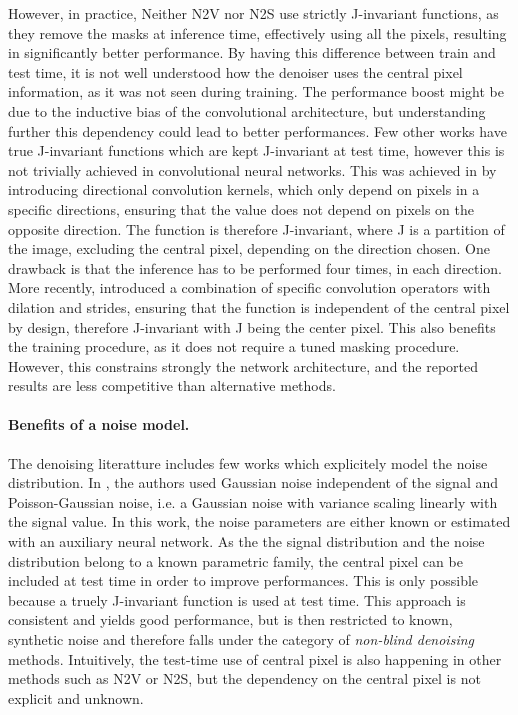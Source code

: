 \documentclass{article}
\begin{document}
However, in practice, Neither N2V nor N2S use strictly J-invariant functions, as they remove the masks at inference time,
effectively using all the pixels, resulting in significantly better performance. By having this difference between train and test time, it is not well understood how the denoiser uses the central pixel information, as it was not seen during training. The performance boost might be due to the inductive bias of the convolutional architecture, but understanding further this dependency could lead to better performances.
Few other works have true J-invariant functions which are kept J-invariant at test time, however this is not trivially achieved in convolutional neural networks. This was achieved in \cite{laine2019high} by introducing directional convolution kernels, which only depend on pixels in a specific directions, ensuring that the value does not depend on pixels on the opposite direction. The function is therefore J-invariant, where J is a partition of the image, excluding the central pixel, depending on the direction chosen. One drawback is that the inference has to be performed four times, in each direction.
More recently, \cite{lee2020noise2kernel} introduced a combination of specific convolution operators with dilation and strides, ensuring that the function is independent of the central pixel by design, therefore J-invariant with J being the center pixel. This also benefits the training procedure, as it does not require a tuned masking procedure. However, this constrains strongly the network architecture, and the reported results are less competitive than alternative methods.

\paragraph{Benefits of a noise model.}
The denoising literatture includes few works which  explicitely model the noise distribution. In \cite{laine2019high}, the authors used Gaussian noise independent of the signal and Poisson-Gaussian noise, i.e. a Gaussian noise with variance scaling linearly with the signal value. In this work, the noise parameters are either known or estimated with an auxiliary neural network. As the the signal distribution and the noise distribution belong to a known parametric family, the central pixel can be included at test time in order to improve performances. This is only possible because a truely J-invariant function is used at test time. This approach is consistent and yields good performance, but is then restricted to known, synthetic noise and therefore falls under the category of \textit{non-blind denoising} methods.
Intuitively, the test-time use of central pixel is also happening in other methods such as N2V or N2S, but the dependency on the  central pixel is not explicit and unknown.
\end{document}
